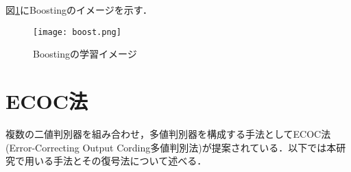 図\ref{ensenble}にBoostingのイメージを示す．

\begin{figure}[H]
\centering
\texttt{[image: boost.png]}
\caption{Boostingの学習イメージ}
\label{ensenble}
\end{figure}



\section{ECOC法\cite{ECOC}}
複数の二値判別器を組み合わせ，多値判別器を構成する手法としてECOC法(Error-Correcting Output Cording多値判別法)が提案されている．以下では本研究で用いる手法とその復号法について述べる．

